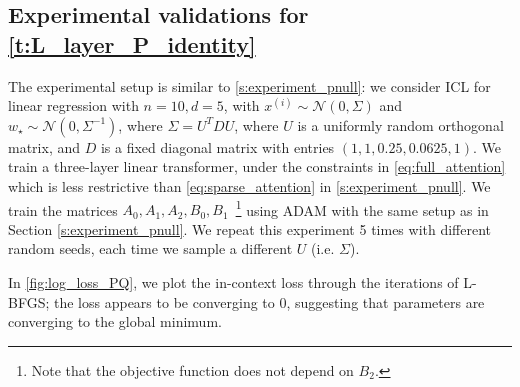 \documentclass{article}
\newcommand{\wstar}{w_\star}
\newcommand{\tx}[1]{x^{(#1)}}
\begin{document}

\subsection{Experimental validations for \autoref{t:L_layer_P_identity}}
\label{s:experiment_PQ}
The experimental setup is similar to \autoref{s:experiment_pnull}: we consider ICL for linear regression with $n=10,d=5$, with $\tx{i}\sim \mathcal{N}(0,\Sigma)$ and $\wstar \sim \mathcal{N}(0,\Sigma^{-1})$, where $\Sigma = U^T D U$, where $U$ is a uniformly random orthogonal matrix, and $D$ is a fixed diagonal matrix with entries $(1,1,0.25,0.0625,1)$. We train a three-layer linear transformer, under the constraints in \eqref{eq:full_attention} which is less restrictive than \eqref{eq:sparse_attention} in \autoref{s:experiment_pnull}. We train the matrices $A_0,A_1,A_2, B_0, B_1$~\footnote{Note that the objective function does not depend on $B_2$.} using ADAM with the same setup as in Section \autoref{s:experiment_pnull}. We repeat this experiment 5 times with different random seeds, each time we sample a different $U$ (i.e. $\Sigma$).

In \autoref{fig:log_loss_PQ}, we plot the in-context loss through the iterations of L-BFGS; the loss appears to be converging to 0, suggesting that parameters are converging to the global minimum. 
\end{document}
